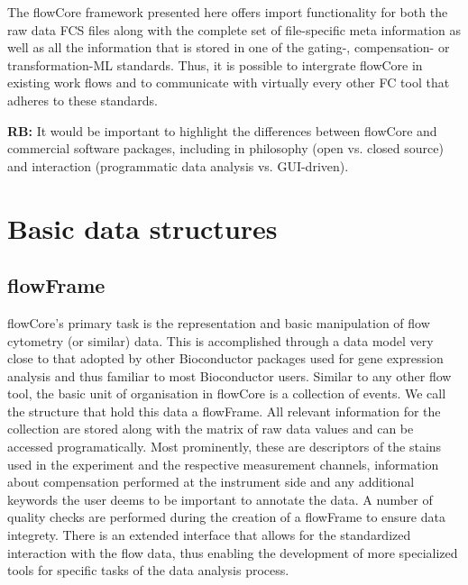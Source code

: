 \documentclass[12pt]{article}
\begin{document}
The flowCore framework presented here offers import functionality for
both the raw data FCS files along with the complete set of
file-specific meta information as well as all the information that is
stored in one of the gating-, compensation- or transformation-ML
standards. Thus, it is possible to intergrate flowCore in existing
work flows and to communicate with virtually every other FC tool that
adheres to these standards. 


{\bf RB:}  It would be important to highlight
the differences between flowCore and commercial software packages,
including in philosophy (open vs. closed source) and interaction
(programmatic data analysis vs. GUI-driven). 



\section{Basic data structures}
\subsection{flowFrame}
flowCore's primary task is the representation and basic manipulation
of flow cytometry (or similar) data. This is accomplished through a
data model very close to that adopted by other Bioconductor packages
used for gene expression analysis and thus familiar to most
Bioconductor users. Similar to any other flow tool, the basic unit of
organisation in flowCore is a collection of events. We call the
structure that hold this data a flowFrame. All relevant information
for the collection are stored along with the matrix of raw data values
and can be accessed programatically. Most prominently, these are
descriptors of the stains used in the experiment and the respective
measurement channels, information about compensation performed at the
instrument side and any additional keywords the user deems to be
important to annotate the data. A number of quality checks are
performed during the creation of a flowFrame to ensure data
integrety. There is an extended interface that allows for the
standardized interaction with the flow data, thus enabling the
development of more specialized tools for specific tasks of the data
analysis process.
\end{document}
